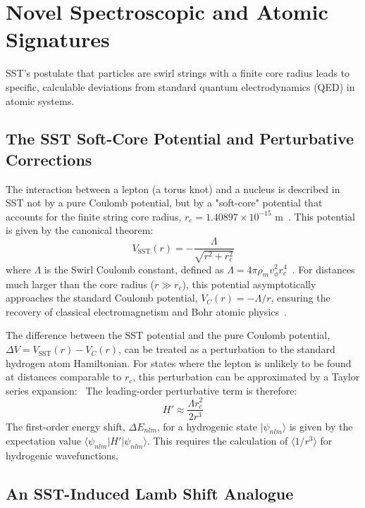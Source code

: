 \documentclass[11pt, a4paper]{article}
\begin{document}
\section{Novel Spectroscopic and Atomic Signatures}

    SST's postulate that particles are swirl strings with a finite core radius leads to specific, calculable deviations from standard quantum electrodynamics (QED) in atomic systems.

    \subsection{The SST Soft-Core Potential and Perturbative Corrections}

        The interaction between a lepton (a torus knot) and a nucleus is described in SST not by a pure Coulomb potential, but by a "soft-core" potential that accounts for the finite string core radius, $r_c = 1.40897 \times 10^{-15}$ m~\cite{sst_canon}. This potential is given by the canonical theorem:
        \begin{equation}
        V_{\text{SST}}(r) = -\frac{\Lambda}{\sqrt{r^2 + r_c^2}}
        \end{equation}
        where $\Lambda$ is the Swirl Coulomb constant, defined as $\Lambda = 4\pi\rho_{m}v_{\phi}^{2}r_{c}^{4}$~\cite{sst_canon}. For distances much larger than the core radius ($r \gg r_c$), this potential asymptotically approaches the standard Coulomb potential, $V_C(r) = -\Lambda/r$, ensuring the recovery of classical electromagnetism and Bohr atomic physics~\cite{sst_canon}.

        The difference between the SST potential and the pure Coulomb potential, $\Delta V = V_{\text{SST}}(r) - V_C(r)$, can be treated as a perturbation to the standard hydrogen atom Hamiltonian. For states where the lepton is unlikely to be found at distances comparable to $r_c$, this perturbation can be approximated by a Taylor series expansion:
        \
        The leading-order perturbative term is therefore:
        \begin{equation}
        H' \approx \frac{\Lambda r_c^2}{2r^3}
        \end{equation}
        The first-order energy shift, $\Delta E_{nlm}$, for a hydrogenic state $|\psi_{nlm}\rangle$ is given by the expectation value $\langle\psi_{nlm}| H' |\psi_{nlm}\rangle$. This requires the calculation of $\langle 1/r^3 \rangle$ for hydrogenic wavefunctions.

    \subsection{An SST-Induced Lamb Shift Analogue}
\end{document}

